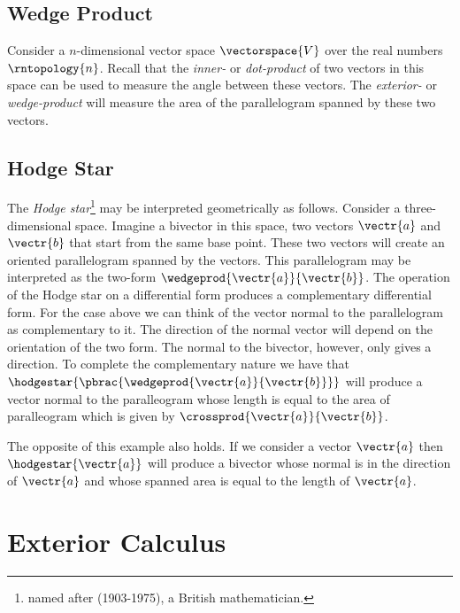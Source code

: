 \subsection{Wedge Product}
\label{subsec:WedgeProduct}

Consider a $n$-dimensional vector space $\vectorspace{V}$ over the real
numbers $\rntopology{n}$. Recall that the \emph{inner-} or \emph{dot-product}
of two vectors in this space can be used to measure the angle between these
vectors. The \emph{exterior-} or \emph{wedge-product} will measure the area of
the parallelogram spanned by these two vectors. 

\subsection{Hodge Star}
\label{subsec:HodgeStar}

The \emph{Hodge star}\footnote{named after
 (1903-1975), a British
mathematician.} may be interpreted geometrically as
follows. Consider a three-dimensional space. Imagine a bivector in
this space, \ie two vectors $\vectr{a}$ and $\vectr{b}$ that start
from the same base point. These two vectors will create an oriented
parallelogram spanned by the vectors. This parallelogram may be
interpreted as the two-form $\wedgeprod{\vectr{a}}{\vectr{b}}$. The
operation of the Hodge star on a differential form produces a
complementary differential form. For the case above we can think of
the vector normal to the parallelogram as complementary to it. The
direction of the normal vector will depend on the orientation of the
two form. The normal to the bivector, however, only gives a
direction. To complete the complementary nature we have that
$\hodgestar{\pbrac{\wedgeprod{\vectr{a}}{\vectr{b}}}}$ will produce a
vector normal to the paralleogram whose length is equal to the area of
paralleogram which is given by $\crossprod{\vectr{a}}{\vectr{b}}$.

The opposite of this example also holds. If we consider a vector $\vectr{a}$
then $\hodgestar{\vectr{a}}$ will produce a bivector whose normal is in the
direction of $\vectr{a}$ and whose spanned area is equal to the length of
$\vectr{a}$.

\section{Exterior Calculus}
\label{sec:ExteriorCalculus}

